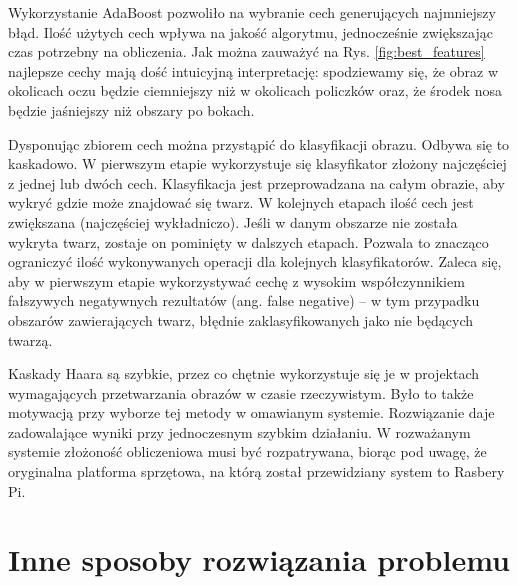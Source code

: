\documentclass[oneside, eng]{mgr}
\begin{document}
Wykorzystanie AdaBoost pozwoliło na wybranie cech generujących najmniejszy błąd. Ilość użytych cech wpływa na jakość algorytmu, jednocześnie zwiększając czas potrzebny na obliczenia. Jak można zauważyć na Rys. \ref{fig:best_features} najlepsze cechy mają dość intuicyjną interpretację: spodziewamy się, że obraz w okolicach oczu będzie ciemniejszy niż w okolicach policzków oraz, że środek nosa będzie jaśniejszy niż obszary po bokach.

Dysponując zbiorem cech można przystąpić do klasyfikacji obrazu. Odbywa się to kaskadowo. W pierwszym etapie wykorzystuje się klasyfikator złożony najczęściej z jednej lub dwóch cech. Klasyfikacja jest przeprowadzana na całym obrazie, aby wykryć gdzie może znajdować się twarz. W kolejnych etapach ilość cech jest zwiększana (najczęściej wykładniczo). Jeśli w danym obszarze nie została wykryta twarz, zostaje on pominięty w dalszych etapach. Pozwala to znacząco ograniczyć ilość wykonywanych operacji dla kolejnych klasyfikatorów. Zaleca się, aby w pierwszym etapie wykorzystywać cechę z wysokim współczynnikiem fałszywych negatywnych rezultatów (ang. false negative) -- w tym przypadku obszarów zawierających twarz, błędnie zaklasyfikowanych jako nie będących twarzą.

Kaskady Haara są szybkie, przez co chętnie wykorzystuje się je w projektach wymagających przetwarzania obrazów w czasie rzeczywistym. Było to także motywacją przy wyborze tej metody w omawianym systemie. Rozwiązanie daje zadowalające wyniki przy jednoczesnym szybkim działaniu. W rozważanym systemie złożoność obliczeniowa musi być rozpatrywana, biorąc pod uwagę, że oryginalna platforma sprzętowa, na którą został przewidziany system to Rasbery Pi.

\section{Inne sposoby rozwiązania problemu} \label{geometrical_features}
\end{document}
